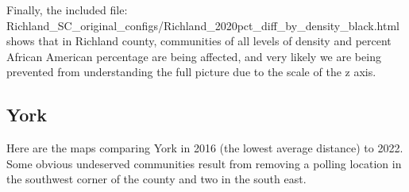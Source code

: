 \documentclass[11pt]{article}
\theoremstyle{remark}
\theoremstyle{definition}
\begin{document}
Finally, the included file: \textrm{Richland\_SC\_original\_configs/Richland\_2020pct\_diff\_by\_density\_black.html} shows that in Richland county, communities of all levels of density and percent African American percentage are being affected, and very likely we are being prevented from understanding the full picture due to the scale of the z axis. 

\pagebreak

\subsection{York}
Here are the maps comparing York in 2016 (the lowest average distance) to 2022. Some obvious undeserved communities result from removing a polling location in the southwest corner of the county and two in the south east.
\end{document}
